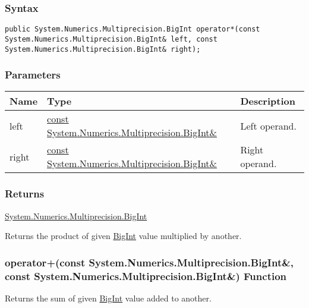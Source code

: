 \documentclass[a4paper,oneside,11.000000pt]{book}
\begin{document}
\subsubsection*{Syntax}
\texttt{public System.Numerics.Multiprecision.BigInt operator*(const System.Numerics.Multiprecision.BigInt\& left, const System.Numerics.Multiprecision.BigInt\& right);}
\subsubsection*{Parameters}
\begin{flushleft}
\begin{supertabular}[l]{!{\raggedright}p{1.30721cm}!{\raggedright}p{8.55945cm}!{\raggedright}p{3.66839cm}}
\textbf{Name}
& \textbf{Type}
& \textbf{Description}
\\
\hline
left
& \hyperlink{System.Numerics.Multiprecision.BigInt}{const System.\-Numerics.\-Multiprecision.\-BigInt\&\-}
& Left operand.

\\
right
& \hyperlink{System.Numerics.Multiprecision.BigInt}{const System.\-Numerics.\-Multiprecision.\-BigInt\&\-}
& Right operand.

\\
\end{supertabular}

\end{flushleft}
\subsubsection*{Returns}
\hyperlink{System.Numerics.Multiprecision.BigInt}{System.\-Numerics.\-Multiprecision.\-BigInt}
\begin{flushleft}
Returns the product of given \hyperlink{System.Numerics.Multiprecision.BigInt}{BigInt} value multiplied by another.

\end{flushleft}
\clearpage

\hypertarget{System.Numerics.Multiprecision.operator.plus.C.R.System.Numerics.Multiprecision.BigInt.C.R.System.Numerics.Multiprecision.BigInt}{\subsubsection*{operator+(const System.Numerics.Multiprecision.BigInt\&, const System.Numerics.Multiprecision.BigInt\&) Function}}
\begin{flushleft}
Returns the sum of given \hyperlink{System.Numerics.Multiprecision.BigInt}{BigInt} value added to another.

\end{flushleft}
\end{document}
